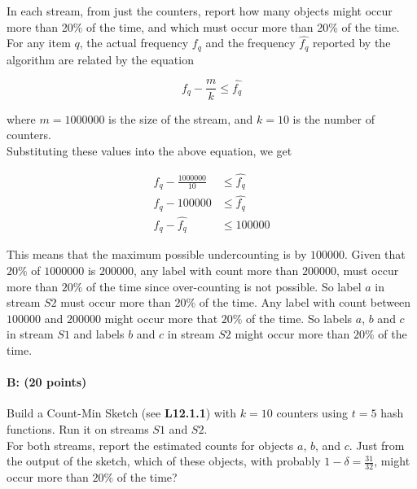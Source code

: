 \documentclass[11pt]{article}
\begin{document}
In each stream, from just the counters, report how many objects might occur more than 20\% of the time, and which must occur more than 20\% of the time. \\

For any item $q$, the actual frequency $f_q$ and the frequency $\hat{f_q}$ reported by the algorithm are related by the equation

$$
f_q - \frac{m}{k} \leq \hat{f_q}
$$

where $m=\num[group-separator={,}]{1000000}$ is the size of the stream, and $k=10$ is the number of counters.\\
Substituting these values into the above equation, we get

\begin{equation*}
\begin{aligned}
f_q - \frac{\num[group-separator={,}]{1000000}}{10} &\leq \hat{f_q}\\
f_q - \num[group-separator={,}]{100000} &\leq \hat{f_q}\\
f_q - \hat{f_q}  &\leq \num[group-separator={,}]{100000}
\end{aligned}
\end{equation*}

This means that the maximum possible undercounting is by $\num[group-separator={,}]{100000}$. Given that $20\%$ of $\num[group-separator={,}]{1000000}$ is $\num[group-separator={,}]{200000}$, any label with count more than $\num[group-separator={,}]{200000}$, must occur more than $20\%$ of the time since over-counting is not possible. So label $a$ in stream $S2$ must occur more than $20\%$ of the time. Any label with count between $\num[group-separator={,}]{100000}$ and $\num[group-separator={,}]{200000}$ might occur more that $20\%$ of the time. So labels $a$, $b$ and $c$ in stream $S1$ and labels $b$ and $c$ in stream $S2$ might occur more than $20\%$ of the time.

\paragraph{B: (20 points)}  
Build a Count-Min Sketch (see \textbf{L12.1.1}) with $k = 10$ counters using $t = 5$ hash functions. Run it on streams $S1$ and $S2$.\\
For both streams, report the estimated counts for objects $a$, $b$, and $c$. Just from the output of the sketch, which of these objects, with probably $1 - \delta = \frac{31}{32}$, might occur more than $20\%$ of the time?\\
\end{document}
